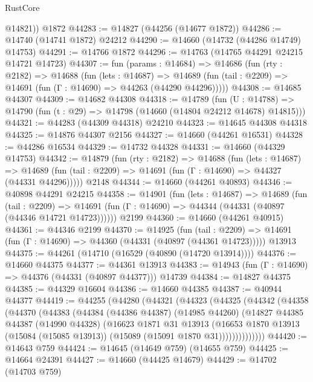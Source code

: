 \begin{lexlean}{RustCore}
\begin{coremodule}
        @14821))
    @1872
@44283 := @14827 (@44256 (@14677 @1872))
@44286 := @14740 (@14741 @1872) @24212
@44290 := @14660 (@14732 (@44286 @14749) @14753)
@44291 := @14766 @1872
@44296 := @14763 (@14765 @44291 @24215 @14721 @14723)
@44307 := fun (params : @14684) =>
  @14686
    (fun (rty : @2182) =>
    @14688
      (fun (lets : @14687) =>
      @14689 (fun (tail : @2209) => @14691 (fun (Γ : @14690) => @44263 (@44290 @44296)))))
@44308 := @14685 @44307
@44309 := @14682 @44308
@44318 := @14789
    (fun (U : @14788) => @14790 (fun (t : @29) => @14798 (@14660 (@14804 @24212 @14678) @14815)))
@44321 := @44283 (@44309 @44318) @24210
@44323 := @14645 @44308 @44318
@44325 := @14876 @44307 @2156
@44327 := @14660 (@44261 @16531)
@44328 := @44286 @16534
@44329 := @14732 @44328
@44331 := @14660 (@44329 @14753)
@44342 := @14879
    (fun (rty : @2182) =>
    @14688
      (fun (lets : @14687) =>
      @14689 (fun (tail : @2209) => @14691 (fun (Γ : @14690) => @44327 (@44331 @44296)))))
    @2148
@44344 := @14660 (@44261 @40893)
@44346 := @40898 @44291 @24215
@44358 := @14901
    (fun (lets : @14687) =>
    @14689
      (fun (tail : @2209) =>
      @14691 (fun (Γ : @14690) => @44344 (@44331 (@40897 (@44346 @14721 @14723))))))
    @2199
@44360 := @14660 (@44261 @40915)
@44361 := @44346 @2199
@44370 := @14925
    (fun (tail : @2209) => @14691 (fun (Γ : @14690) => @44360 (@44331 (@40897 (@44361 @14723)))))
    @13913
@44375 := @44261 (@14710 (@16529 (@40890 (@14720 @13914))))
@44376 := @14660 @44375
@44377 := @44361 @13913
@44383 := @14943 (fun (Γ : @14690) => @44376 (@44331 (@40897 @44377))) @14739
@44384 := @14827 @44375
@44385 := @44329 @16604
@44386 := @14660 @44385
@44387 := @40944 @44377
@44419 := @44255
    (@44280
      (@44321
        (@44323
          (@44325
            (@44342
              (@44358
                (@44370
                  (@44383
                    (@44384
                      (@44386 @44387)
                      (@14985 @44260)
                      (@14827
                        @44385
                        @44387
                        (@14990 @44328)
                        (@16623
                          @1871
                          @31
                          @13913
                          (@16653
                            @1870
                            @13913
                            (@15084 (@15085 @13913))
                            (@15089 (@15091 @1870 @31))))))))))))))
@44420 := @14643 @759
@44424 := @14645 (@14649 @759) (@14655 @759)
@44425 := @14664 @24391
@44427 := @14660 (@44425 @14679)
@44429 := @14702 (@14703 @759)

\end{coremodule}
\end{lexlean}
